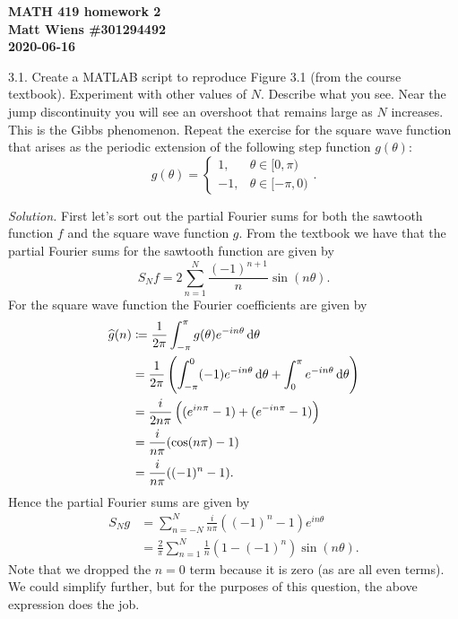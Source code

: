 \documentclass{article}
\begin{document}
\textbf{MATH 419 homework 2} \\
\textbf{Matt Wiens \#301294492} \\
\textbf{2020-06-16}

3.1. Create a MATLAB script to reproduce Figure 3.1 (from the course
  textbook). Experiment with other values of $N$. Describe what you see.
  Near the jump discontinuity you will see an overshoot that remains
  large as $N$ increases. This is the Gibbs phenomenon. Repeat the
  exercise for the square wave function that arises as the periodic
  extension of the following step function $g(\theta)$:
%
\begin{equation*}
    g(\theta) =
    \begin{cases}
        1,&\theta \in [0, \pi) \\
        -1,&\theta \in [- \pi, 0)
    \end{cases}
    .
\end{equation*}

\textit{Solution.} First let's sort out the partial Fourier sums for
both the sawtooth function $f$ and the square wave function $g$. From
the textbook we have that the partial Fourier sums for the sawtooth
function are given by
%
\begin{equation*}
    S_N f = 2 \sum_{n = 1}^N \frac{(-1)^{n + 1}}{n} \sin(n \theta)
    .
\end{equation*}
%
For the square wave function the Fourier coefficients are given by
%
\begin{align*}
    \widehat{g}(n)
        &\coloneqq \frac{1}{2 \pi} \int_{-\pi}^\pi g(\theta) e^{-i n \theta} \dif \theta \\
        &= \frac{1}{2 \pi}
            \del{
                \int_{-\pi}^0 (-1) e^{-i n \theta} \dif \theta
                +
                \int_0^{\pi} e^{-i n \theta} \dif \theta
            } \\
        &= \frac{i}{2 n \pi}
            \del{
                (e^{i n \pi} - 1)
                +
                (e^{-i n \pi} - 1)
            } \\
        &= \frac{i}{n \pi} (\cos(n \pi) - 1) \\
        &= \frac{i}{n \pi} ((-1)^{n} - 1)
        .
\end{align*}
%
Hence the partial Fourier sums are given by
%
\begin{align*}
    S_N g &= \sum_{n = - N}^N \frac{i}{n \pi} ((-1)^{n} - 1) e^{i n \theta} \\
          &= \frac{2}{\pi} \sum_{n = 1}^N \frac{1}{n} (1 - (-1)^{n}) \sin(n \theta)
          .
\end{align*}
%
Note that we dropped the $n = 0$ term because it is zero (as are all
even terms). We could simplify further, but for the purposes of this
question, the above expression does the job.
\end{document}
